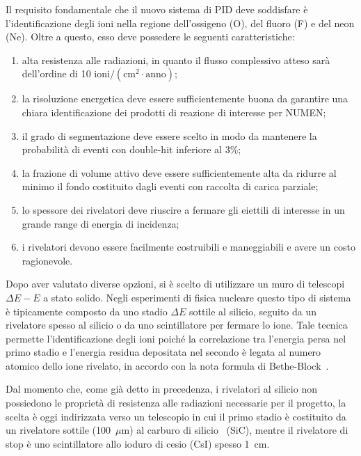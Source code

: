 Il requisito fondamentale che il nuovo sistema di PID deve soddisfare è l'identificazione degli ioni nella regione dell'ossigeno (O), del fluoro (F) e del neon (Ne). 
Oltre a questo, esso deve possedere le seguenti caratteristiche:
\begin{enumerate}
	\item alta resistenza alle radiazioni, in quanto il flusso complessivo atteso sarà dell'ordine di 10 $\mbox{ioni}/(\mbox{cm}^2 \cdot \mbox{anno})$;
	\item la risoluzione energetica deve essere sufficientemente buona da garantire una chiara identificazione dei prodotti di reazione di interesse per NUMEN;
	\item il grado di segmentazione deve essere scelto in modo da mantenere la probabilità di eventi con double-hit inferiore al 3\%;
	\item la frazione di volume attivo deve essere sufficientemente alta da ridurre al minimo il fondo costituito dagli eventi con raccolta di carica parziale;
	\item lo spessore dei rivelatori deve riuscire a fermare gli eiettili di interesse in un grande range di energia di incidenza;
	\item i rivelatori devono essere facilmente costruibili e maneggiabili e avere un costo ragionevole.
\end{enumerate}


Dopo aver valutato diverse opzioni, si è scelto di utilizzare un muro di telescopi $ \Delta E - E $ a stato solido.
Negli esperimenti di fisica nucleare questo tipo di sistema è tipicamente composto da uno stadio $\Delta E$ sottile al silicio, seguito da un rivelatore spesso al silicio o da uno scintillatore per fermare lo ione.
Tale tecnica permette l'identificazione degli ioni poiché la correlazione tra l'energia persa nel primo stadio e l'energia residua depositata nel secondo è legata al numero atomico dello ione rivelato, in accordo con la nota formula di Bethe-Block~\cite{knoll:10}.

Dal momento che, come già detto in precedenza, i rivelatori al silicio non possiedono le proprietà di resistenza alle radiazioni necessarie per il progetto, la scelta è oggi indirizzata verso un telescopio in cui il primo stadio è costituito da un rivelatore sottile (100~$\mu $m) al carburo di silicio~\cite{tudisco:sensors18} (SiC), mentre il rivelatore di stop è uno scintillatore allo ioduro di cesio (CsI) spesso 1~cm.

